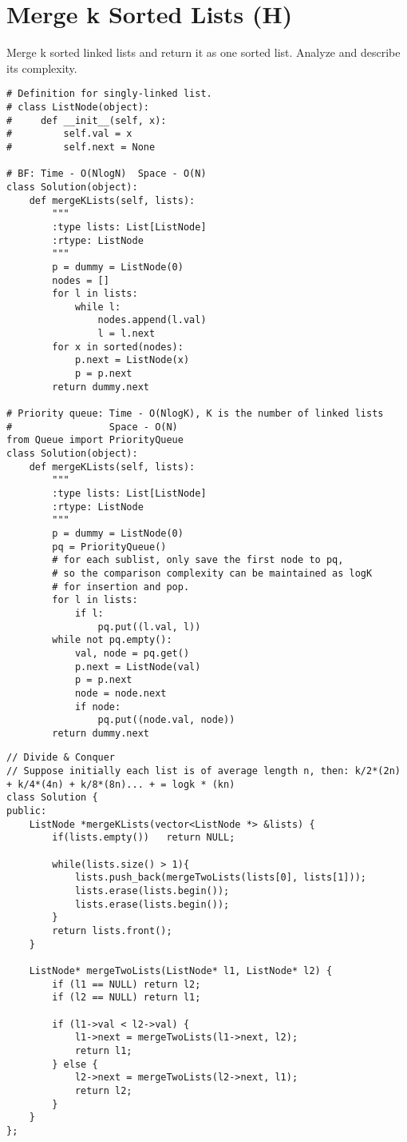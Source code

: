 \section{Merge k Sorted Lists (H)}
Merge k sorted linked lists and return it as one sorted list. Analyze and describe its complexity. \\
 
 \begin{lstlisting}
# Definition for singly-linked list.
# class ListNode(object):
#     def __init__(self, x):
#         self.val = x
#         self.next = None

# BF: Time - O(NlogN)  Space - O(N)
class Solution(object):
    def mergeKLists(self, lists):
        """
        :type lists: List[ListNode]
        :rtype: ListNode
        """
        p = dummy = ListNode(0)
        nodes = []
        for l in lists:
            while l:
                nodes.append(l.val)
                l = l.next
        for x in sorted(nodes):
            p.next = ListNode(x)
            p = p.next
        return dummy.next
 
# Priority queue: Time - O(NlogK), K is the number of linked lists
#                 Space - O(N)
from Queue import PriorityQueue
class Solution(object):
    def mergeKLists(self, lists):
        """
        :type lists: List[ListNode]
        :rtype: ListNode
        """
        p = dummy = ListNode(0)
        pq = PriorityQueue()
        # for each sublist, only save the first node to pq,
        # so the comparison complexity can be maintained as logK 
        # for insertion and pop.
        for l in lists:
            if l: 
                pq.put((l.val, l))
        while not pq.empty():
            val, node = pq.get()
            p.next = ListNode(val)
            p = p.next
            node = node.next
            if node: 
                pq.put((node.val, node))
        return dummy.next
\end{lstlisting}
 
\begin{lstlisting}
// Divide & Conquer
// Suppose initially each list is of average length n, then: k/2*(2n) + k/4*(4n) + k/8*(8n)... + = logk * (kn)
class Solution {
public:
    ListNode *mergeKLists(vector<ListNode *> &lists) {
        if(lists.empty())   return NULL;
        
        while(lists.size() > 1){
            lists.push_back(mergeTwoLists(lists[0], lists[1]));
            lists.erase(lists.begin());
            lists.erase(lists.begin());
        }
        return lists.front();
    }
    
    ListNode* mergeTwoLists(ListNode* l1, ListNode* l2) {
        if (l1 == NULL) return l2;
        if (l2 == NULL) return l1;
        
        if (l1->val < l2->val) {
            l1->next = mergeTwoLists(l1->next, l2);
            return l1;
        } else {
            l2->next = mergeTwoLists(l2->next, l1);
            return l2;
        }
    }
};
\end{lstlisting}